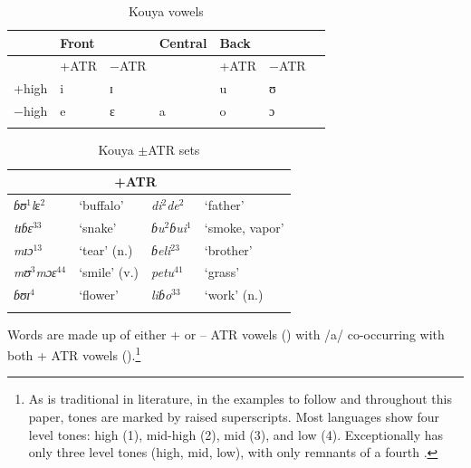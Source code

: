 \documentclass[output=paper,newtxmath,modfonts,nonflat]{langsci/langscibook}
\begin{document}
\begin{table}[t]
\begin{tabular}{lllllll}
\lsptoprule
& Front   &&   Central &   Back &\\
\midrule
& +ATR & −ATR   &   &  +ATR & −ATR\\

+high  &  i &	ɪ    &&   u  &  ʊ\\

−high  &  e & ɛ  &  a  &  o & ɔ\\
\lspbottomrule
\end{tabular}  
\caption{Kouya vowels}
\label{tab:zogbo:1}
\end{table}
\begin{table}[t]

\caption{Kouya $\pm$ATR sets}     \label{tab:zogbo:2a}
\begin{tabular}{llll}

\lsptoprule
\multicolumn{2}{c}{−ATR} & \multicolumn{2}{c}{+ATR}\\
\midrule
\textit{ɓʊ}{$^1$}\textit{l}ɛ$^2$ &     {‘buffalo’} & \textit{di}$^2$\textit{de}$^2$ & {‘father’}\\

\textit{tɪɓɛ}$^{33}$  &  ‘snake’   &   \textit{ɓu}$^2$\textit{ɓui}$^1$ & {‘smoke,  vapor’}\\

\textit{mɪɔ}$^{13}$  &  ‘tear’ (n.) &    \textit{ɓeli}$^{23}$  &  ‘brother’ \\

\textit{m{ʊ}}{$^3$}\textit{{m}ɔɛ}$^{44}$ & ‘smile’ (v.)  &  \textit{petu}$^{41}$  &  ‘grass’ \\

\textit{ɓʊɪ}$^4$ & ‘flower’  &  \textit{liɓo}$^{33}$    & ‘work’ (n.) \\
\lspbottomrule
\end{tabular}
\end{table}
 Words are made up of either + or – ATR vowels () with /a/ co-occurring with both + ATR vowels ().\footnote{As is traditional in  literature, in the examples to follow and throughout this paper, tones are marked by raised superscripts. Most  languages show four level tones: high (1), mid-high (2), mid (3), and low (4).  Exceptionally  has only three level tones (high, mid, low), with only remnants of a fourth  \citep{Gratrix1975}.} 
\clearpage 
\end{document}
